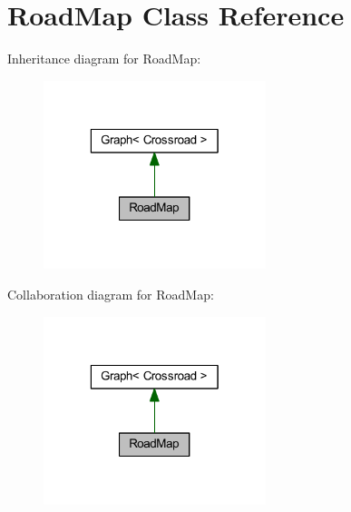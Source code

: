 \hypertarget{class_road_map}{}\section{Road\+Map Class Reference}
\label{class_road_map}


Inheritance diagram for Road\+Map\+:
\nopagebreak
\begin{figure}[H]
\begin{center}
\leavevmode
\includegraphics[width=184pt]{class_road_map__inherit__graph}
\end{center}
\end{figure}


Collaboration diagram for Road\+Map\+:
\nopagebreak
\begin{figure}[H]
\begin{center}
\leavevmode
\includegraphics[width=184pt]{class_road_map__coll__graph}
\end{center}
\end{figure}
